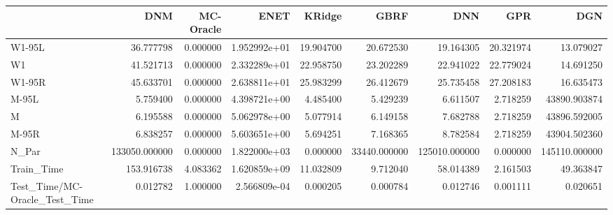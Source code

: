 \begin{tabular}{lrrrrrrrr}
\toprule
{} &            DNM &  MC-Oracle &          ENET &     KRidge &          GBRF &            DNN &        GPR &            DGN \\
\midrule
W1-95L                        &      36.777798 &   0.000000 &  1.952992e+01 &  19.904700 &     20.672530 &      19.164305 &  20.321974 &      13.079027 \\
W1                            &      41.521713 &   0.000000 &  2.332289e+01 &  22.958750 &     23.202289 &      22.941022 &  22.779024 &      14.691250 \\
W1-95R                        &      45.633701 &   0.000000 &  2.638811e+01 &  25.983299 &     26.412679 &      25.735458 &  27.208183 &      16.635473 \\
M-95L                         &       5.759400 &   0.000000 &  4.398721e+00 &   4.485400 &      5.429239 &       6.611507 &   2.718259 &   43890.903874 \\
M                             &       6.195588 &   0.000000 &  5.062978e+00 &   5.077914 &      6.149158 &       7.682788 &   2.718259 &   43896.592005 \\
M-95R                         &       6.838257 &   0.000000 &  5.603651e+00 &   5.694251 &      7.168365 &       8.782584 &   2.718259 &   43904.502360 \\
N\_Par                         &  133050.000000 &   0.000000 &  1.822000e+03 &   0.000000 &  33440.000000 &  125010.000000 &   0.000000 &  145110.000000 \\
Train\_Time                    &     153.916738 &   4.083362 &  1.620859e+09 &  11.032809 &      9.712040 &      58.014389 &   2.161503 &      49.363847 \\
Test\_Time/MC-Oracle\_Test\_Time &       0.012782 &   1.000000 &  2.566809e-04 &   0.000205 &      0.000784 &       0.012746 &   0.001111 &       0.020651 \\
\bottomrule
\end{tabular}
